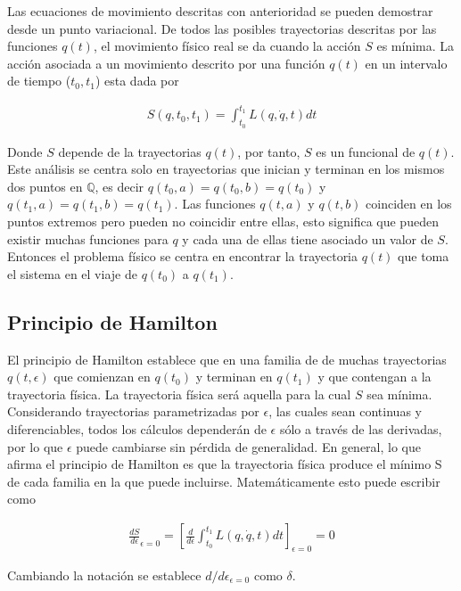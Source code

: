Las ecuaciones de movimiento descritas con anterioridad se pueden demostrar desde un punto variacional. De todos las posibles trayectorias descritas por las funciones $q(t)$, el movimiento físico real se da cuando la acción $S$ es mínima. La acción asociada a un movimiento descrito por una función $q(t)$ en un intervalo de tiempo ($t_0, t_1$) esta dada por

\begin{gather*}
    S(q,t_0,t_1) = \int_{t_0}^{t_1} L(q,\dot{q},t)dt
\end{gather*}

Donde $S$ depende de la trayectorias $q(t)$, por tanto, $S$ es un funcional de $q(t)$. Este análisis se centra solo en trayectorias que inician y terminan en los mismos dos puntos en $\mathbb{Q}$, es decir $q(t_0,a) = q(t_0,b) = q(t_0)$ y $q(t_1,a) = q(t_1,b) = q(t_1)$. Las funciones $q(t,a)$ y $q(t,b)$ coinciden en los puntos extremos pero pueden no coincidir entre ellas, esto significa que pueden existir muchas funciones para $q$ y cada una de ellas tiene asociado un valor de $S$. Entonces el problema físico se centra en encontrar la trayectoria $q(t)$ que toma el sistema en el viaje de $q(t_0)$ a $q(t_1)$. 

\subsection[short]{Principio de Hamilton}


El principio de Hamilton establece que en una familia de de muchas trayectorias $q(t,\epsilon)$ que comienzan en $q(t_0)$ y terminan en $q(t_1)$ y que contengan a la trayectoria física. La trayectoria física será aquella para la cual $S$ sea mínima.  Considerando trayectorias parametrizadas por $\epsilon$, las cuales sean continuas y diferenciables, todos los cálculos dependerán de $\epsilon$ sólo a través de las derivadas, por lo que $\epsilon$ puede cambiarse sin pérdida de generalidad. En general, lo que afirma el principio de Hamilton es que la trayectoria física produce el mínimo S de cada familia en la que puede incluirse. Matemáticamente esto puede escribir como 

\begin{gather*}
    \frac{dS}{d\epsilon}_{\epsilon = 0} = \left[\frac{d}{d\epsilon} \int_{t_0}^{t_1} L(q,\dot{q},t)dt\right]_{\epsilon = 0} = 0
\end{gather*}

Cambiando la notación se establece $d/d\epsilon_{\epsilon  = 0}$ como $\delta$.

